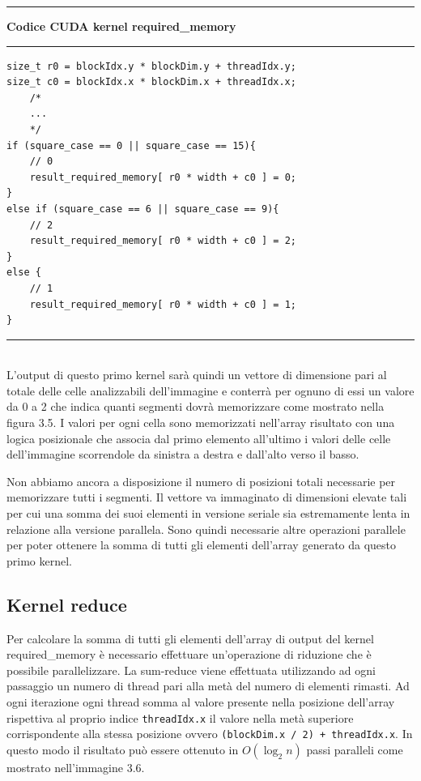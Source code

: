 \documentclass[12pt,a4paper]{report}
\begin{document}
\noindent\rule[0.5ex]{\linewidth}{2pt}
\small{\textbf{Codice CUDA kernel required\_memory}} \\
\noindent\rule[0.5ex]{\linewidth}{1pt}
\begin{lstlisting}
size_t r0 = blockIdx.y * blockDim.y + threadIdx.y;
size_t c0 = blockIdx.x * blockDim.x + threadIdx.x;
    /*
    ...
    */
if (square_case == 0 || square_case == 15){
    // 0
    result_required_memory[ r0 * width + c0 ] = 0;
}
else if (square_case == 6 || square_case == 9){
    // 2
    result_required_memory[ r0 * width + c0 ] = 2;
}
else {
    // 1
    result_required_memory[ r0 * width + c0 ] = 1;
}  
\end{lstlisting}
\noindent\rule[0.5ex]{\linewidth}{1pt} \\[10pt]
\newpage
L'output di questo primo kernel sarà quindi un vettore di dimensione pari al totale delle celle analizzabili dell'immagine e conterrà per ognuno di essi un valore da 0 a 2 che indica quanti segmenti dovrà memorizzare come mostrato nella figura 3.5. I valori per ogni cella sono memorizzati nell'array risultato con una logica posizionale che associa dal primo elemento all'ultimo i valori delle celle dell'immagine scorrendole da sinistra a destra e dall'alto verso il basso.
\begin{figure}[H]
\centering
\begin{floatrow}[1]
\end{floatrow}
\end{figure} 
Non abbiamo ancora a disposizione il numero di posizioni totali necessarie per memorizzare tutti i segmenti. Il vettore va immaginato di dimensioni elevate tali per cui una somma dei suoi elementi in versione seriale sia estremamente lenta in relazione alla versione parallela. Sono quindi necessarie altre operazioni parallele per poter ottenere la somma di tutti gli elementi dell'array generato da questo primo kernel. \newpage

\subsection{Kernel reduce}
Per calcolare la somma di tutti gli elementi dell'array di output del kernel required\_memory è necessario effettuare un'operazione di riduzione che è possibile parallelizzare. \newline
La sum-reduce viene effettuata utilizzando ad ogni passaggio un numero di thread pari alla metà del numero di elementi rimasti. Ad ogni iterazione ogni thread somma al valore presente nella posizione dell'array rispettiva al proprio indice \verb|threadIdx.x| il valore nella metà superiore corrispondente alla stessa posizione ovvero \verb|(blockDim.x / 2) + threadIdx.x|. \newline In questo modo il risultato può essere ottenuto in $O(\log_2 n)$ passi paralleli come mostrato nell'immagine 3.6.
\end{document}

